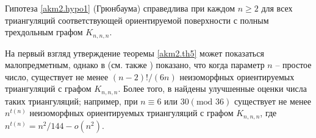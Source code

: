 \begin{theorem}
\label{akm2.th5}
Гипотеза \ref{akm2.hypo1} (Грюнбаума) справедлива при каждом  $n \ge 2$  для всех триангуляций соответствующей ориентируемой поверхности с полным трехдольным графом $K_{n,n,n}$.
\end{theorem}

На первый взгляд утверждение теоремы \ref{akm2.th5} может показаться малопредметным, однако в \cite{granel5} (см. также \cite{granel2}) показано, что когда параметр $n$ -- простое число, существует не менее $(n-2)!/(6n)$ неизоморфных ориентируемых триангуляций с графом $K_{n,n,n}$. Более того, в \cite{knorm} найдены улучшенные оценки числа таких триангуляций; например, при $n \equiv 6\text{ или }30 (\text{mod }36)$ существует не менее $n^{t(n)}$ неизоморфных ориентируемых триангуляций с графом $K_{n,n,n}$, где $n^{t(n)}=n^2/144-o(n^2)$.
